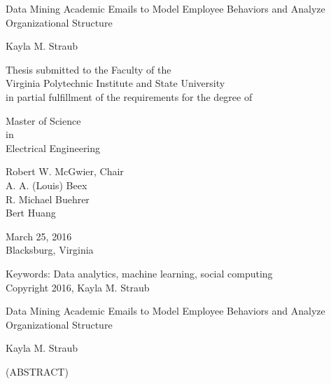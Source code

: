 \documentclass[12pt]{report}
\begin{document}
\thispagestyle{empty}
\begin{center}

{\Large 
Data Mining Academic Emails to Model Employee Behaviors and Analyze Organizational Structure
}

\vfill

Kayla M. Straub

\vfill

Thesis submitted to the Faculty of the \\
Virginia Polytechnic Institute and State University \\
in partial fulfillment of the requirements for the degree of

\vfill

Master of Science \\
in \\
Electrical Engineering
\vfill

Robert W. McGwier, Chair \\
A. A. (Louis) Beex\\
R. Michael Buehrer\\
Bert Huang

\vfill

March 25, 2016 \\
Blacksburg, Virginia

\vfill

Keywords: Data analytics, machine learning, social computing
\\
Copyright 2016, Kayla M. Straub

\end{center}

\pagebreak

\thispagestyle{empty}
\begin{center}

{\large Data Mining Academic Emails to Model Employee Behaviors and Analyze Organizational Structure}

\vfill

Kayla M. Straub

\vfill

(ABSTRACT)

\vfill

\end{center}
\end{document}
